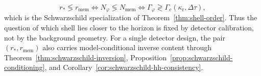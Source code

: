 \begin{example}
\[
r_* \lessgtr r_{\mathrm{mem}}
\iff
N_\varphi \lessgtr N_{\mathrm{mem}}
\iff
\Gamma_\varphi \gtrless \Gamma_c(\kappa_{\mathrm r},\Delta\tau),
\]
which is the Schwarzschild specialization of Theorem~\ref{thm:shell-order}. Thus the question of which shell lies closer to the horizon is fixed by detector calibration, not by the background geometry. For a single detector design, the pair $(r_*,r_{\mathrm{mem}})$ also carries model-conditional inverse content through Theorem~\ref{thm:schwarzschild-inversion}, Proposition~\ref{prop:schwarzschild-conditioning}, and Corollary~\ref{cor:schwarzschild-hh-consistency}.
\end{example}

